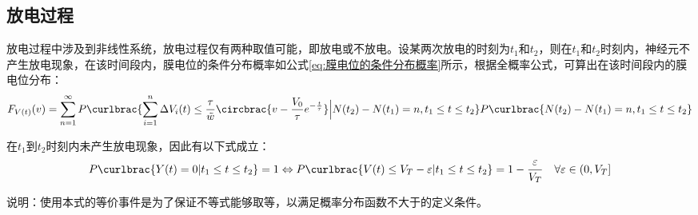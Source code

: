 \documentclass[11pt]{article}
\begin{document}
\subsection{放电过程}
放电过程中涉及到非线性系统，放电过程仅有两种取值可能，即放电或不放电。设某两次放电的时刻为$t_1$和$t_2$，则在$t_1$和$t_2$时刻内，神经元不产生放电现象，在该时间段内，膜电位的条件分布概率如公式\ref{eq:膜电位的条件分布概率}所示，根据全概率公式，可算出在该时间段内的膜电位分布：
\begin{align}
  F_{V(t)}(v)=    \sum_{n=1}^{\infty}P\curlbrac{\sum_{i=1}^{n}\Delta V_i(t)\le \frac{\tau}{\tilde{w}}\circbrac{v-\frac{V_0}{\tau}e^{-\frac{t}{\tau}}}\Big| N(t_2)-N(t_1)=n,t_1\le t\le t_2}P\curlbrac{ N(t_2)-N(t_1)=n,t_1\le t\le t_2}
  \label{eq:膜电位分布概率}
\end{align}\par
在$t_1$到$t_2$时刻内未产生放电现象，因此有以下式成立：
\begin{align*}
  P\curlbrac{Y(t)=0|t_1\le t\le t_2}=1\Leftrightarrow  P\curlbrac{V(t)\le V_T-\varepsilon|t_1\le t\le t_2}=1-\frac{\varepsilon }{V_T}\quad\forall\varepsilon\in(0, V_T]
\end{align*}\par
说明：使用本式的等价事件是为了保证不等式能够取等，以满足概率分布函数不大于的定义条件。
\newpage
\printbibliography[heading=bibliography,title=参考文献]
\end{document}

